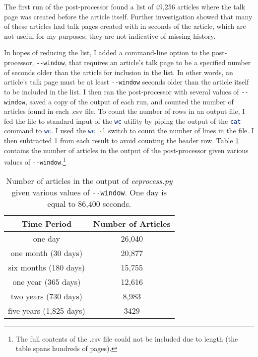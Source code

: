 \documentclass[14pt,a4paper]{report}
\begin{document}
The first run of the post-processor found a list of 49,256 articles where the talk page was created before the article itself. Further investigation showed that many of these articles had talk pages created with in seconds of the article, which are not useful for my purposes; they are not indicative of missing history.

In hopes of reducing the list, I added a command-line option to the post-processor, \lstinline[language=sh]{--window}, that requires an article's talk page to be a specified number of seconds older than the article for inclusion in the list. In other words, an article's talk page must be at least \lstinline[language=sh]{--window} seconds older than the article itself to be included in the list. I then ran the post-processor with several values of \lstinline[language=sh]{--window}, saved a copy of the output of each run, and counted the number of articles found in each .csv file. To count the number of rows in an output file, I fed the file to standard input of the \lstinline[language=sh]{wc} utility by piping the output of the \lstinline[language=sh]{cat} command to \lstinline[language=sh]{wc}. I used the \lstinline[language=sh]{wc -l} switch to count the number of lines in the file. I then subtracted 1 from each result to avoid counting the header row. Table \ref{tab:eeprocess} contains the number of articles in the output of the post-processor given various values of \lstinline[language=sh]{--window}.\footnote{The full contents of the .csv file could not be included due to length (the table spans hundreds of pages).}
\begin{table}[h!]
  \centering
  \caption{Number of articles in the output of \textit{eeprocess.py} given various values of \lstinline[language=sh]{--window}. One day is equal to 86,400 seconds.}
  \label{tab:eeprocess}
  \begin{tabular}{cc}
    \toprule
    Time Period&Number of Articles\\
    \midrule
one day&26,040\\
    one month (30 days)&20,877\\
    six months (180 days)&15,755\\
one year (365 days)&12,616\\
two years (730 days)&8,983\\
five years (1,825 days)&3429\\
    \bottomrule
  \end{tabular}
\end{table}
\end{document}
